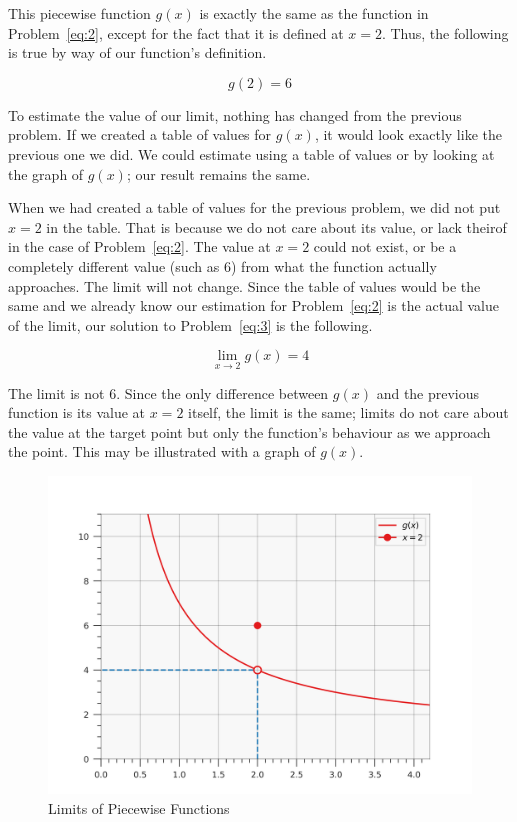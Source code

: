 \documentclass[12pt]{article}
\theoremstyle{definition}
\begin{document}
This piecewise function $g(x)$ is exactly the same as the function in Problem~\eqref{eq:2}, except for the fact that it is defined at $x=2$.
Thus, the following is true by way of our function's definition.

\begin{equation*}
    g(2) = 6
\end{equation*}

To estimate the value of our limit, nothing has changed from the previous problem.
If we created a table of values for $g(x)$, it would look exactly like the previous one we did.
We could estimate using a table of values or by looking at the graph of $g(x)$; our result remains the same.

When we had created a table of values for the previous problem, we did not put $x=2$ in the table.
That is because we do not care about its value, or lack theirof in the case of Problem~\eqref{eq:2}.
The value at $x=2$ could not exist, or be a completely different value (such as 6) from what the function actually approaches.
The limit will not change.
Since the table of values would be the same and we already know our estimation for Problem~\eqref{eq:2} is the actual value of the limit, our solution to Problem~\eqref{eq:3} is the following.

\begin{equation}
    \lim_{x\to2} g(x) = 4
\end{equation}

The limit is not 6.
Since the only difference between $g(x)$ and the previous function is its value at $x=2$ itself, the limit is the same; limits do not care about the value at the target point but only the function's behaviour as we approach the point.
This may be illustrated with a graph of $g(x)$.

\begin{figure}[H]
    \centering
    \includegraphics[width=12.5cm, keepaspectratio]{limits_2.png}
    \caption{Limits of Piecewise Functions}
    \label{fig:fig2}
\end{figure}
\end{document}
